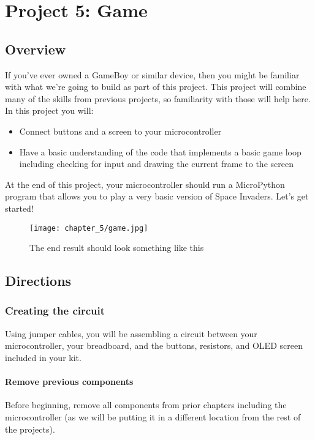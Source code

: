 \chapter{Project 5: Game}

\section{Overview}
If you've ever owned a GameBoy or similar device, then you might be familiar with what we're going to build as part of this project.
This project will combine many of the skills from previous projects, so familiarity with those will help here. In this project you will:
\begin{itemize}
    \item Connect buttons and a screen to your microcontroller
    \item Have a basic understanding of the code that implements a basic game loop including checking for input and drawing the current frame to the screen
\end{itemize}
At the end of this project, your microcontroller should run a MicroPython program that allows you to play a very basic version of
Space Invaders. Let's get started!
\begin{figure}[H]
\centering
    \texttt{[image: chapter\_5/game.jpg]}
    \caption{The end result should look something like this}
\end{figure}

\pagebreak

\section{Directions}

\subsection{Creating the circuit}
Using jumper cables, you will be assembling a circuit between your microcontroller, your breadboard, and the buttons,
resistors, and OLED screen included in your kit.

\subsubsection{Remove previous components}
Before beginning, remove all components from prior chapters including the microcontroller (as we will be putting it in
a different location from the rest of the projects).

